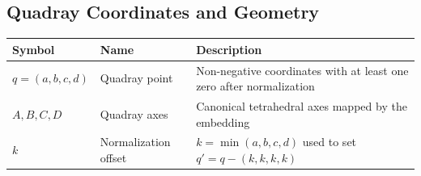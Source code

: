 \documentclass[
  10pt,
]{article}
\begin{document}
\hypertarget{quadray-coordinates-and-geometry}{%
\subsection{Quadray Coordinates and
Geometry}\label{quadray-coordinates-and-geometry}}

\begin{longtable}[]{@{}lll@{}}
\toprule
\begin{minipage}[b]{0.30\columnwidth}\raggedright
Symbol\strut
\end{minipage} & \begin{minipage}[b]{0.30\columnwidth}\raggedright
Name\strut
\end{minipage} & \begin{minipage}[b]{0.30\columnwidth}\raggedright
Description\strut
\end{minipage}\tabularnewline
\midrule
\endhead
\begin{minipage}[t]{0.30\columnwidth}\raggedright
\(q=(a,b,c,d)\)\strut
\end{minipage} & \begin{minipage}[t]{0.30\columnwidth}\raggedright
Quadray point\strut
\end{minipage} & \begin{minipage}[t]{0.30\columnwidth}\raggedright
Non-negative coordinates with at least one zero after
normalization\strut
\end{minipage}\tabularnewline
\begin{minipage}[t]{0.30\columnwidth}\raggedright
\(A,B,C,D\)\strut
\end{minipage} & \begin{minipage}[t]{0.30\columnwidth}\raggedright
Quadray axes\strut
\end{minipage} & \begin{minipage}[t]{0.30\columnwidth}\raggedright
Canonical tetrahedral axes mapped by the embedding\strut
\end{minipage}\tabularnewline
\begin{minipage}[t]{0.30\columnwidth}\raggedright
\(k\)\strut
\end{minipage} & \begin{minipage}[t]{0.30\columnwidth}\raggedright
Normalization offset\strut
\end{minipage} & \begin{minipage}[t]{0.30\columnwidth}\raggedright
\(k=\min(a,b,c,d)\) used to set \(q' = q - (k,k,k,k)\)\strut
\end{minipage}\tabularnewline

\end{longtable}
\end{document}
